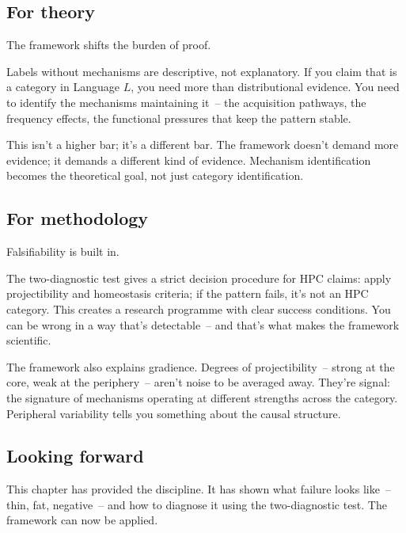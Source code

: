 \subsection{For theory}
\label{sec:8:for-theory}

The framework shifts the burden of proof.

Labels without mechanisms are descriptive, not explanatory. If you claim that  is a category in Language $L$, you need more than distributional evidence. You need to identify the mechanisms maintaining it~-- the acquisition pathways, the frequency effects, the functional pressures that keep the pattern stable.

This isn't a higher bar; it's a different bar. The framework doesn't demand more evidence; it demands a different kind of evidence. Mechanism identification becomes the theoretical goal, not just category identification.

\subsection{For methodology}
\label{sec:8:for-methodology}

Falsifiability is built in.

The two-diagnostic test gives a strict decision procedure for HPC claims: apply projectibility and homeostasis criteria; if the pattern fails, it's not an HPC category. This creates a research programme with clear success conditions. You can be wrong in a way that's detectable~-- and that's what makes the framework scientific.

The framework also explains gradience. Degrees of projectibility~-- strong at the core, weak at the periphery~-- aren't noise to be averaged away. They're signal: the signature of mechanisms operating at different strengths across the category. Peripheral variability tells you something about the causal structure.

\subsection{Looking forward}
\label{sec:8:looking-forward}

This chapter has provided the discipline. It has shown what failure looks like~-- thin, fat, negative~-- and how to diagnose it using the two-diagnostic test. The framework can now be applied.


